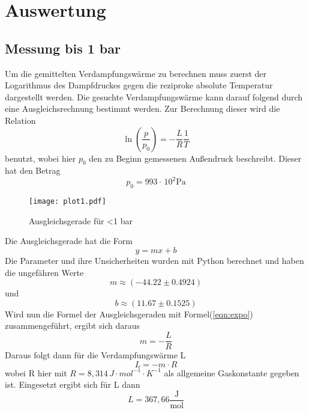 \section{Auswertung}
\label{sec:Auswertung}


\subsection{Messung bis 1 bar}
Um die gemittelten Verdampfungswärme zu berechnen muss zuerst der Logarithmus des Dampfdruckes gegen die reziproke absolute Temperatur dargestellt werden. Die gesuchte
Verdampfungswärme kann darauf folgend durch eine Ausgleichsrechnung bestimmt werden. Zur Berechnung dieser wird die Relation
\begin{equation*}
  \label{eqn:druck3}
  \ln\left(\frac{p}{p_0}\right)=- \frac{L}{R} \frac{1}{T}
\end{equation*}
\newline
benutzt, wobei hier $p_0$ den zu Beginn gemessenen Außendruck beschreibt. Dieser hat den Betrag
\begin{equation*}
  p_0 = 993 \cdot \, \mathrm{10^2 Pa}
\end{equation*}

\begin{figure}[H]
  \centering
  \texttt{[image: plot1.pdf]}
  \caption{Ausgleichsgerade für <1 bar}
  \label{fig:plot1}
\end{figure}
\noindent
Die Ausgleichsgerade hat die Form
\begin{equation*}
  y = mx + b
\end{equation*}
Die Parameter und ihre Unsicherheiten wurden mit Python berechnet und haben die ungefähren Werte
\begin{equation*}
  m \approx (-44.22\pm 0.4924)
\end{equation*}
und
\begin{equation*}
  b \approx (11.67\pm 0.1525)
\end{equation*}
Wird nun die Formel der Ausgleichsgeraden mit Formel(\autoref{eqn:expo}) zusammengeführt, ergibt sich daraus
\begin{equation*}
  m=-\frac{L}{R}
\end{equation*}
Daraus folgt dann für die Verdampfungswärme L
\begin{equation*}
  L = - m \cdot R
\end{equation*}
wobei R hier mit $R=8,314 \, J \cdot mol^{-1} \cdot K^{-1}$ als allgemeine Gaskonstante gegeben ist.
Eingesetzt ergibt sich für L dann
\begin{equation*}
  L = 367,66 \mathrm{\frac{J}{mol}}
\end{equation*}

